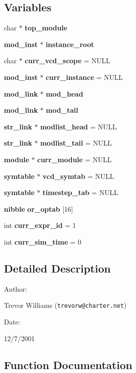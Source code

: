 \subsection*{Variables}
\begin{CompactItemize}
\item 
char $\ast$ {\bf top\_\-module}
\item 
{\bf mod\_\-inst} $\ast$ {\bf instance\_\-root}
\item 
char $\ast$ {\bf curr\_\-vcd\_\-scope} = NULL
\item 
{\bf mod\_\-inst} $\ast$ {\bf curr\_\-instance} = NULL
\item 
{\bf mod\_\-link} $\ast$ {\bf mod\_\-head}
\item 
{\bf mod\_\-link} $\ast$ {\bf mod\_\-tail}
\item 
{\bf str\_\-link} $\ast$ {\bf modlist\_\-head} = NULL
\item 
{\bf str\_\-link} $\ast$ {\bf modlist\_\-tail} = NULL
\item 
{\bf module} $\ast$ {\bf curr\_\-module} = NULL
\item 
{\bf symtable} $\ast$ {\bf vcd\_\-symtab} = NULL
\item 
{\bf symtable} $\ast$ {\bf timestep\_\-tab} = NULL
\item 
{\bf nibble} {\bf or\_\-optab} [16]
\item 
int {\bf curr\_\-expr\_\-id} = 1
\item 
int {\bf curr\_\-sim\_\-time} = 0
\end{CompactItemize}


\subsection{Detailed Description}


\begin{Desc}
\item[Author: ]\par
Trevor Williams ({\tt trevorw@charter.net}) \end{Desc}
\begin{Desc}
\item[Date: ]\par
12/7/2001\end{Desc}


\subsection{Function Documentation}
